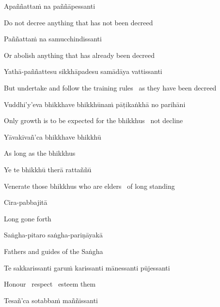 Apaññattaṁ na paññāpessanti

\begin{english}
  Do not decree anything that has not been decreed
\end{english}

Paññattaṁ na samucchindissanti

\begin{english}
  Or abolish anything that has already been decreed
\end{english}

Yathā-paññattesu sikkhāpadesu samādāya vattissanti

\begin{english-hang}
  But undertake and follow the training rules \breathmark\ as they have been decreed
\end{english-hang}

Vuddhi'y'eva bhikkhave bhikkhūnaṁ pāṭikaṅkhā no parihāni

\begin{english}
  Only growth is to be expected for the bhikkhus \breathmark\ not decline
\end{english}

Yāvakīvañ'ca bhikkhave bhikkhū

\begin{english}
  As long as the bhikkhus
\end{english}

Ye te bhikkhū therā rattaññū

\begin{english}
  Venerate those bhikkhus who are elders \breathmark\ of long standing
\end{english}

Cira-pabbajitā

\begin{english}
  Long gone forth
\end{english}

Saṅgha-pitaro saṅgha-pariṇāyakā

\begin{english}
  Fathers and guides of the Saṅgha
\end{english}

Te sakkarissanti garuṁ karissanti mānessanti pūjessanti

\begin{english}
  Honour \breathmark\ respect \breathmark\ esteem them
\end{english}

Tesañ'ca sotabbaṁ maññissanti

